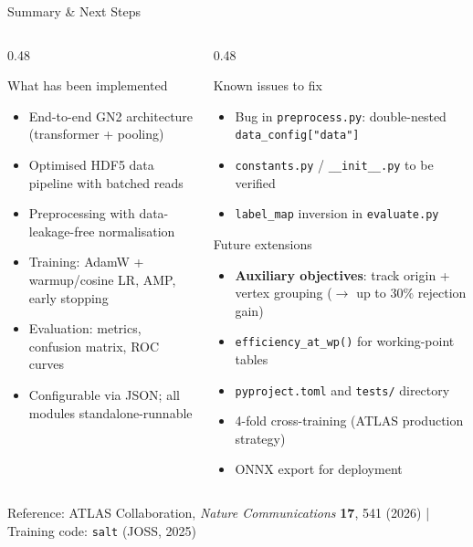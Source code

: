 \documentclass[aspectratio=169, 10pt]{beamer}
\begin{document}
\begin{frame}{Summary \& Next Steps}
\begin{columns}[T]
  \begin{column}{0.48\textwidth}
    \begin{block}{What has been implemented}
      \begin{itemize}
        \item[$\checkmark$] End-to-end GN2 architecture (transformer + pooling)
        \item[$\checkmark$] Optimised HDF5 data pipeline with batched reads
        \item[$\checkmark$] Preprocessing with data-leakage-free normalisation
        \item[$\checkmark$] Training: AdamW + warmup/cosine LR, AMP, early stopping
        \item[$\checkmark$] Evaluation: metrics, confusion matrix, ROC curves
        \item[$\checkmark$] Configurable via JSON; all modules standalone-runnable
      \end{itemize}
    \end{block}
  \end{column}
  \begin{column}{0.48\textwidth}
    \begin{block}{Known issues to fix}
      \begin{itemize}
        \item Bug in \texttt{preprocess.py}: double-nested \texttt{data\_config["data"]}
        \item \texttt{constants.py} / \texttt{\_\_init\_\_.py} to be verified
        \item \texttt{label\_map} inversion in \texttt{evaluate.py}
      \end{itemize}
    \end{block}
    \begin{block}{Future extensions}
      \begin{itemize}
        \item \textbf{Auxiliary objectives}: track origin + vertex grouping
              ($\to$ up to 30\% rejection gain)
        \item \texttt{efficiency\_at\_wp()} for working-point tables
        \item \texttt{pyproject.toml} and \texttt{tests/} directory
        \item 4-fold cross-training (ATLAS production strategy)
        \item ONNX export for deployment
      \end{itemize}
    \end{block}
  \end{column}
\end{columns}
\vspace{4pt}
\begin{center}
  \small\color{gray}
  Reference: ATLAS Collaboration, \textit{Nature Communications} \textbf{17}, 541 (2026)
  \quad|\quad
  Training code: \texttt{salt} (JOSS, 2025)
\end{center}
\end{frame}
\end{document}
